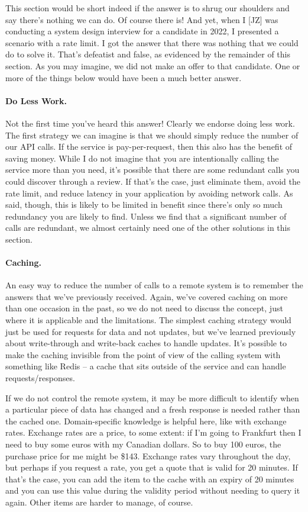 This section would be short indeed if the answer is to shrug our shoulders and say there's nothing we can do. Of course there is! And yet, when I [JZ] was conducting a system design interview for a candidate in 2022, I presented a scenario with a rate limit. I got the answer that there was nothing that we could do to solve it. That's defeatist and false, as evidenced by the remainder of this section. As you may imagine, we did not make an offer to that candidate. One or more of the things below would have been a much better answer.



\paragraph{Do Less Work.}
Not the first time you've heard this answer! Clearly we endorse doing less work. The first strategy we can imagine is that we should simply reduce the number of our API calls. If the service is pay-per-request, then this also has the benefit of saving money. While I do not imagine that you are intentionally calling the service more than you need, it's possible that there are some redundant calls you could discover through a review. If that's the case, just eliminate them, avoid the rate limit, and reduce latency in your application by avoiding network calls. As said, though, this is likely to be limited in benefit since there's only so much redundancy you are likely to find. Unless we find that a significant number of calls are redundant, we almost certainly need one of the other solutions in this section. 

\paragraph{Caching.}
An easy way to reduce the number of calls to a remote system is to remember the answers that we've previously received. Again, we've covered caching on more than one occasion in the past, so we do not need to discuss the concept, just where it is applicable and the limitations. The simplest caching strategy would just be used for requests for data and not updates, but we've learned previously about write-through and write-back caches to handle updates. It's possible to make the caching invisible from the point of view of the calling system with something like Redis -- a cache that sits outside of the service and can handle requests/responses. 

If we do not control the remote system, it may be more difficult to identify when a particular piece of data has changed and a fresh response is needed rather than the cached one. Domain-specific knowledge is helpful here, like with exchange rates. Exchange rates are a price, to some extent: if I'm going to Frankfurt then I need to buy some euros with my Canadian dollars. So to buy 100 euros, the purchase price for me might be \$143. Exchange rates vary throughout the day, but perhaps if you request a rate, you get a quote that is valid for 20 minutes. If that's the case, you can add the item to the cache with an expiry of 20 minutes and you can use this value during the validity period without needing to query it again. Other items are harder to manage, of course.


